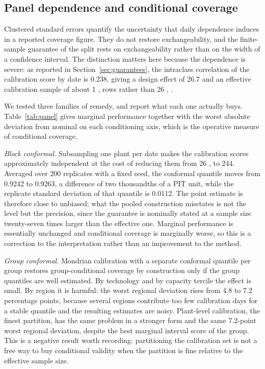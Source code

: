 \documentclass[preprint,3p,times]{elsarticle}
\providecommand{\DIFaddtex}[1]{{\protect\color{blue} \sf #1}} %
\providecommand{\DIFaddFL}[1]{\DIFadd{#1}} %
\providecommand{\DIFadd}[1]{\texorpdfstring{\DIFaddtex{#1}}{#1}} %
\begin{document}


\subsection{Panel dependence and conditional coverage}
\label{sec:panel}

\DIFaddFL{Clustered standard errors quantify the uncertainty that daily dependence induces in a reported coverage figure. They do not restore exchangeability, and the finite-sample guarantee of the split rests on exchangeability rather than on the width of a confidence interval. The distinction matters here because the dependence is severe: as reported in Section~\ref{sec:guarantees}, the intraclass correlation of the calibration score by date is 0.238, giving a design effect of 26.7 and an effective calibration sample of about 1}{\DIFaddFL{,}}\DIFaddFL{000 rows rather than 26}{\DIFaddFL{,}}\DIFaddFL{552.
}

\DIFaddFL{We tested three families of remedy, and report what each one actually buys. Table~\ref{tab:panel} gives marginal performance together with the worst absolute deviation from nominal on each conditioning axis, which is the operative measure of conditional coverage.
}



\DIFaddFL{\emph{Block conformal.} Subsampling one plant per date makes the calibration scores approximately independent at the cost of reducing them from 26}{\DIFaddFL{,}}\DIFaddFL{552 to 244. Averaged over 200 replicates with a fixed seed, the conformal quantile moves from 0.9242 to 0.9263, a difference of two thousandths of a PIT unit, while the replicate standard deviation of that quantile is 0.0112. The point estimate is therefore close to unbiased; what the pooled construction misstates is not the level but the precision, since the guarantee is nominally stated at a sample size twenty-seven times larger than the effective one. Marginal performance is essentially unchanged and conditional coverage is marginally worse, so this is a correction to the interpretation rather than an improvement to the method.
}

\DIFaddFL{\emph{Group conformal.} Mondrian calibration with a separate conformal quantile per group restores group-conditional coverage by construction only if the group quantiles are well estimated. By technology and by capacity tercile the effect is small. By region it is harmful: the worst regional deviation rises from 4.8 to 7.2 percentage points, because several regions contribute too few calibration days for a stable quantile and the resulting estimates are noisy. Plant-level calibration, the finest partition, has the same problem in a stronger form and the same 7.2-point worst regional deviation, despite the best marginal interval score of the group. This is a negative result worth recording: partitioning the calibration set is not a free way to buy conditional validity when the partition is fine relative to the effective sample size.
}
\end{document}

